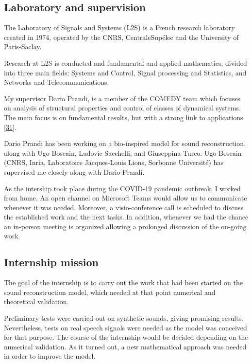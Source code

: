 \documentclass[american,]{article}
\theoremstyle{definition}
\theoremstyle{definition}
\theoremstyle{definition}
\theoremstyle{remark}
\begin{document}
\hypertarget{laboratory-and-supervision}{%
\subsection{Laboratory and supervision}\label{laboratory-and-supervision}}

The Laboratory of Signals and Systems (L2S) is a French
research laboratory created in 1974, operated by the CNRS,
CentraleSupélec and the University of Paris-Saclay.

Research at L2S is conducted and fundamental and applied mathematics,
divided into three main fields:
Systems and Control, Signal processing and Statistics,
and Networks and Telecommunications.

My supervisor Dario Prandi, is a member of the COMEDY team
which focuses on analysis of structural properties
and control of classes of dynamical systems.
The main focus is on fundamental results, but with a strong
link to applications {[}\protect\hyperlink{ref-l2s}{31}{]}.

Dario Prandi has been working on a bio-inspired model for sound
reconstruction, along with Ugo Boscain, Ludovic Sacchelli,
and Giuseppina Turco.
Ugo Boscain (CNRS, Inria, Laboratoire Jacques-Louis Lions,
Sorbonne Université) has supervised me closely along with Dario Prandi.

As the intership took place during the COVID-19 pandemic outbreak,
I worked from home.
An open channel on Microsoft Teams would allow us to communicate
whenever it was needed. Moreover, a visio-conference call
is scheduled to discuss the established work and the next tasks.
In addition, whenever we had the chance an in-person meeting is organized
allowing a prolonged discussion of the on-going work.

\hypertarget{internship-mission}{%
\subsection{Internship mission}\label{internship-mission}}

The goal of the internship is to carry out the work that had been started
on the sound reconstruction model, which needed at that point
numerical and theoretical validation.

Preliminary tests were carried out on synthetic sounds, giving promising results.
Nevertheless, tests on real speech signals were needed as the model
was conceived for that purpose.
The course of the internship would be decided depending on the numerical validation.
As it turned out, a new mathematical approach was needed in order
to improve the model.
\end{document}
